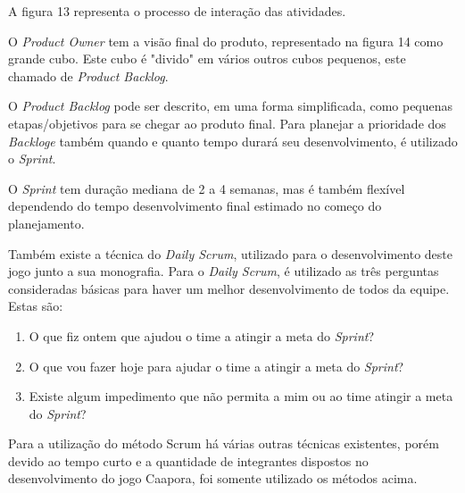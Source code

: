 		A figura 13 representa o processo de interação das atividades.


	\begin{figure}[h!]
		\centering
	\end{figure}
	
O \textit{Product Owner} tem a visão final do produto, representado na figura 14 como grande cubo. Este cubo é "divido" em vários outros cubos pequenos, este chamado de \textit{Product Backlog}.

O \textit{Product Backlog} pode ser descrito, em uma forma simplificada, como pequenas etapas/objetivos para se chegar ao produto final.
Para planejar a prioridade dos \textit{Backloge} também quando e quanto tempo durará seu desenvolvimento, é utilizado o \textit{Sprint}.

O \textit{Sprint} tem duração mediana de 2 a 4 semanas, mas é também flexível dependendo do tempo desenvolvimento final estimado no começo do planejamento.

Também existe a técnica do \textit{Daily Scrum}, utilizado para o desenvolvimento deste jogo junto a sua monografia. Para o \textit{Daily Scrum}, é utilizado as três perguntas consideradas básicas para haver um melhor desenvolvimento de todos da equipe.
Estas são:

\begin{enumerate}
   \item O que fiz ontem que ajudou o time a atingir a meta do \textit{Sprint}?
   \item O que vou fazer hoje para ajudar o time a atingir a meta do \textit{Sprint}?
   \item  Existe algum impedimento que não permita a mim ou ao time atingir a meta do \textit{Sprint}?
 \end{enumerate}
 \cite{scrum}
 
Para a utilização do método Scrum há várias outras técnicas existentes, porém devido ao tempo curto e a quantidade de integrantes dispostos no desenvolvimento do jogo Caapora, foi somente utilizado os métodos acima.

